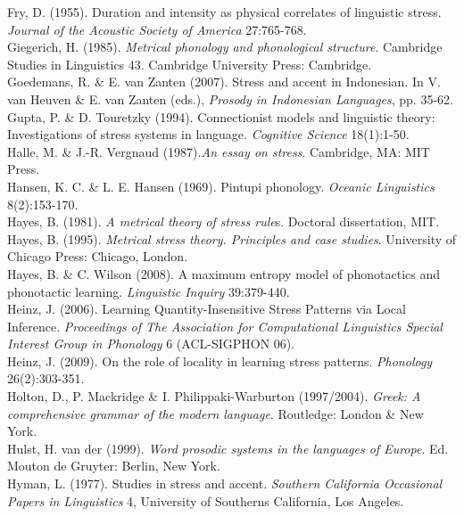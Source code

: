 \documentclass[a4paper]{article}
\begin{document}
Fry, D. (1955). Duration and intensity as physical correlates of linguistic stress. \textit{Journal of the Acoustic Society of America }27:765-768.\\\noindent
Giegerich, H. (1985). \textit{Metrical phonology and phonological structure}. Cambridge Studies in Linguistics 43. Cambridge University Press: Cambridge.\\\noindent
Goedemans, R. \& E. van Zanten (2007). Stress and accent in Indonesian. In V. van Heuven \& E. van Zanten (eds.), \textit{Prosody in Indonesian Languages}, pp. 35-62.\\\noindent
Gupta, P. \& D. Touretzky (1994). Connectionist models and linguistic theory: Investigations of stress systems in language. \textit{Cognitive Science }18(1):1-50.\\\noindent
Halle, M. \& J.-R. Vergnaud (1987).\textit{An essay on stress}. Cambridge, MA: MIT Press.\\\noindent
Hansen, K. C. \& L. E. Hansen (1969). Pintupi phonology. \textit{Oceanic Linguistics }8(2):153-170.\\\noindent
Hayes, B. (1981). \textit{A metrical theory of stress rule}s. Doctoral dissertation, MIT.\\\noindent
Hayes, B. (1995). \textit{Metrical stress theory. Principles and case studies}. University of Chicago Press: Chicago, London.\\\noindent
Hayes, B. \& C. Wilson (2008). A maximum entropy model of phonotactics and phonotactic learning. \textit{Linguistic Inquiry }39:379-440.\\\noindent
Heinz, J. (2006). Learning Quantity-Insensitive Stress Patterns via Local Inference. \textit{Proceedings of The Association for Computational Linguistics Special Interest Group in Phonology }6 (ACL-SIGPHON 06).\\\noindent
Heinz, J. (2009). On the role of locality in learning stress patterns. \textit{Phonology} 26(2):303-351.\\\noindent
Holton, D., P. Mackridge \& I. Philippaki-Warburton (1997/2004). \textit{Greek: A comprehensive grammar of the modern language}. Routledge: London \& New York.\\\noindent
Hulst, H. van der (1999). \textit{Word prosodic systems in the languages of Europe}. Ed. Mouton de Gruyter: Berlin, New York.\\\noindent
Hyman, L. (1977). Studies in stress and accent. \textit{Southern California Occasional Papers in Linguistics }4, University of Southerns California, Los Angeles.\\\noindent
\end{document}
